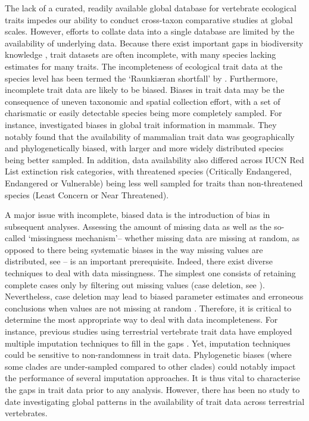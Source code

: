 The lack of a curated, readily available global database for vertebrate ecological traits impedes our ability to conduct cross-taxon comparative studies at global scales. However, efforts to collate data into a single database are limited by the availability of underlying data. Because there exist important gaps in biodiversity knowledge \citep{Hortal2015}, trait datasets are often incomplete, with many species lacking estimates for many traits. The incompleteness of ecological trait data at the species level has been termed the `Raunki{\ae}ran shortfall' by \citet{Hortal2015}. Furthermore, incomplete trait data are likely to be biased. Biases in trait data may be the consequence of uneven taxonomic and spatial collection effort, with a set of charismatic or easily detectable species being more completely sampled. For instance, \citet{Gonzalez-Suarez2012} investigated biases in global trait information in mammals. They notably found that the availability of mammalian trait data was geographically and phylogenetically biased, with larger and more widely distributed species being better sampled. In addition, data availability also differed across IUCN Red List extinction risk categories, with threatened species (Critically Endangered, Endangered or Vulnerable) being less well sampled for traits than non-threatened species (Least Concern or Near Threatened).

A major issue with incomplete, biased data is the introduction of bias in subsequent analyses. Assessing the amount of missing data as well as the so-called ‘missingness mechanism’-- whether missing data are missing at random, as opposed to there being systematic biases in the way missing values are distributed, see \citet{Baraldi2010} -- is an important prerequisite. Indeed, there exist diverse techniques to deal with data missingness. The simplest one consists of retaining complete cases only by filtering out missing values (case deletion, see \citet{Nakagawa2008}). Nevertheless, case deletion may lead to biased parameter estimates and erroneous conclusions when values are not missing at random \citep{Gonzalez-Suarez2012}. Therefore, it is critical to determine the most appropriate way to deal with data incompleteness. For instance, previous studies using terrestrial vertebrate trait data have employed multiple imputation techniques to fill in the gaps \citep{Gonzalez-Suarez2012, Cooke2019b}. Yet, imputation techniques could be sensitive to non-randomness in trait data. Phylogenetic biases (where some clades are under-sampled compared to other clades) could notably impact the performance of several imputation approaches. It is thus vital to characterise the gaps in trait data prior to any analysis. However, there has been no study to date investigating global patterns in the availability of trait data across terrestrial vertebrates.

